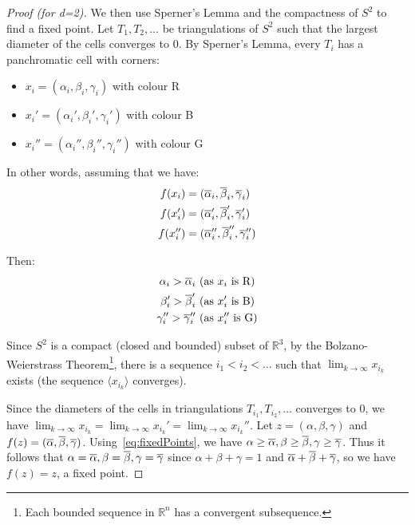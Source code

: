 \begin{proof}[Proof \emph{(for d=2)}]
	We then use Sperner's Lemma and the compactness of $S^2$ to find a fixed
	point. Let $T_1, T_2, \ldots$ be triangulations of $S^2$ such that the
	largest diameter of the cells converges to 0. By Sperner's Lemma, every
	$T_i$ has a panchromatic cell with corners:
	\begin{itemize}
		\item $x_i = (\alpha_i, \beta_i, \gamma_i)$ with colour R
		\item $x_i' = (\alpha_i', \beta_i', \gamma_i')$ with colour B
		\item $x_i'' = (\alpha_i'', \beta_i'', \gamma_i'')$ with colour G
	\end{itemize}

	In other words, assuming that we have:
	\begin{equation}
		\begin{split}
			f(x_i) & = (\overline{\alpha}_i, \overline{\beta}_i, \overline{\gamma}_i) \\
			f(x_i') & = (\overline{\alpha}_i', \overline{\beta}_i', \overline{\gamma}_i') \\
			f(x_i'') & = (\overline{\alpha}_i'', \overline{\beta}_i'', \overline{\gamma}_i'')
		\end{split}
	\end{equation}

	Then:
	\begin{equation}
		\label{eq:fixedPoints}
		\begin{split}
			\alpha_i > \overline{\alpha}_i & \text{ (as $x_i$ is R)} \\
			\beta_i' > \overline{\beta}_i' & \text{ (as $x_i'$ is B)} \\
			\gamma_i'' > \overline{\gamma}_i'' & \text{ (as $x_i''$ is G)}
		\end{split}
	\end{equation}

	Since $S^2$ is a compact (closed and bounded) subset of $\mathbb{R}^3$, by
	the Bolzano-Weierstrass Theorem\footnote{Each bounded sequence in
	$\mathbb{R}^n$ has a convergent subsequence.}, there is a sequence $i_1 <
	i_2 < \ldots$ such that $\lim_{k \rightarrow \infty} x_{i_k}$ exists (the
	sequence $\langle x_{i_k} \rangle$ converges).

	Since the diameters of the cells in triangulations $T_{i_1}, T_{i_2},
	\ldots$ converges to 0, we have $\lim_{k \rightarrow \infty} x_{i_k} =
	\lim_{k \rightarrow \infty} x_{i_k}' = \lim_{k \rightarrow \infty}
	x_{i_k}''$. Let $z = (\alpha, \beta, \gamma)$ and $f(z) =
	(\overline{\alpha}, \overline{\beta}, \overline{\gamma})$.
	Using~\eqref{eq:fixedPoints}, we have $\alpha \ge \overline{\alpha}, \beta
	\ge \overline{\beta}, \gamma \ge \overline{\gamma}$. Thus it follows that
	$\alpha = \overline{\alpha}, \beta = \overline{\beta}, \gamma = \overline{\gamma}$
	since $\alpha + \beta + \gamma = 1$ and $\overline{\alpha} + \overline{\beta} +
	\overline{\gamma}$, so we have $f(z) = z$, a fixed point.
\end{proof}

